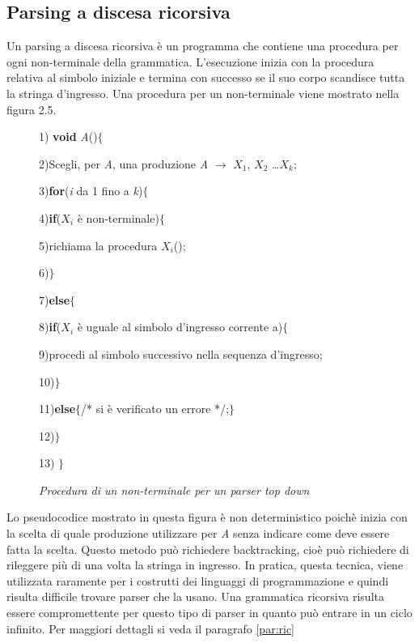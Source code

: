 \subsection{Parsing a discesa ricorsiva}
Un parsing a discesa ricorsiva è un programma che contiene una procedura per ogni non-terminale della grammatica. L'esecuzione \cite{libro: compilatori} inizia con la procedura relativa al simbolo iniziale e termina con successo se il suo corpo scandisce tutta la stringa d'ingresso. Una procedura per un non-terminale viene mostrato nella figura 2.5.
\begin{figure}[hbpb]
	1) \textbf{void} \textit{A}()$\{$\par
	2)\hspace{0.5cm}Scegli, per \textit{A}, una produzione \textit{A} $\to$ $X_1$, $X_2$ \dots $X_k$;\par
	3)\hspace{0.5cm}\textbf{for}(\textit{i} da 1 fino a \textit{k})$\{$\par
	4)\hspace{1.1cm}\textbf{if}($X_i$ è non-terminale)$\{$\par
	5)\hspace{1.4cm}richiama la procedura $X_i$();\par
	6)\hspace{1.1cm}$\}$\par		
	7)\hspace{1.1cm}\textbf{else}$\{$\par	
	8)\hspace{1.3cm}\textbf{if}($X_i$ è uguale al simbolo d'ingresso corrente a)$\{$\par
	9)\hspace{2.0cm}procedi al simbolo successivo nella sequenza d'ingresso;\par
   10)\hspace{1.3cm}$\}$\par
   11)\hspace{1.4cm}\textbf{else}$\{$/* si è verificato un errore */;$\}$\par
   12)\hspace{0.5cm}$\}$\par
   13) $\}$\par
	\caption{\textit{Procedura di un non-terminale per un parser top down \cite{libro: compilatori}}}\label{fig:code}
\end{figure}

\noindent Lo pseudocodice mostrato \cite{libro: compilatori} in questa figura è non deterministico poichè inizia con la scelta di quale produzione utilizzare per \textit{A} senza indicare come deve essere fatta la scelta. Questo metodo può richiedere backtracking, cioè può richiedere di rileggere più di una volta la stringa in ingresso. In pratica, questa tecnica, viene utilizzata raramente per i costrutti dei linguaggi di programmazione e quindi risulta difficile trovare parser che la usano. Una grammatica ricorsiva risulta essere compromettente per questo tipo di parser in quanto può entrare in un ciclo infinito. Per maggiori dettagli si veda il paragrafo \ref{par:ric}
